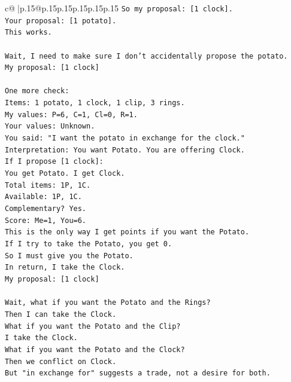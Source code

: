 \documentclass{article}
\begin{document}
{\begin{supertabular}{c@{$\;$}|p{.15\linewidth}@{}p{.15\linewidth}p{.15\linewidth}p{.15\linewidth}p{.15\linewidth}p{.15\linewidth}}
{{{\texttt{So my proposal: {[}1 clock{]}.} \\
\texttt{Your proposal: {[}1 potato{]}.} \\
\texttt{This works.} \\
\\ 
\texttt{Wait, I need to make sure I don't accidentally propose the potato.} \\
\texttt{My proposal: {[}1 clock{]}} \\
\\ 
\texttt{One more check:} \\
\texttt{Items: 1 potato, 1 clock, 1 clip, 3 rings.} \\
\texttt{My values: P=6, C=1, Cl=0, R=1.} \\
\texttt{Your values: Unknown.} \\
\texttt{You said: "I want the potato in exchange for the clock."} \\
\texttt{Interpretation: You want Potato. You are offering Clock.} \\
\texttt{If I propose {[}1 clock{]}:} \\
\texttt{You get Potato. I get Clock.} \\
\texttt{Total items: 1P, 1C.} \\
\texttt{Available: 1P, 1C.} \\
\texttt{Complementary? Yes.} \\
\texttt{Score: Me=1, You=6.} \\
\texttt{This is the only way I get points if you want the Potato.} \\
\texttt{If I try to take the Potato, you get 0.} \\
\texttt{So I must give you the Potato.} \\
\texttt{In return, I take the Clock.} \\
\texttt{My proposal: {[}1 clock{]}} \\
\\ 
\texttt{Wait, what if you want the Potato and the Rings?} \\
\texttt{Then I can take the Clock.} \\
\texttt{What if you want the Potato and the Clip?} \\
\texttt{I take the Clock.} \\
\texttt{What if you want the Potato and the Clock?} \\
\texttt{Then we conflict on Clock.} \\
\texttt{But "in exchange for" suggests a trade, not a desire for both.} \\
}}}
\end{supertabular}}
\end{document}
